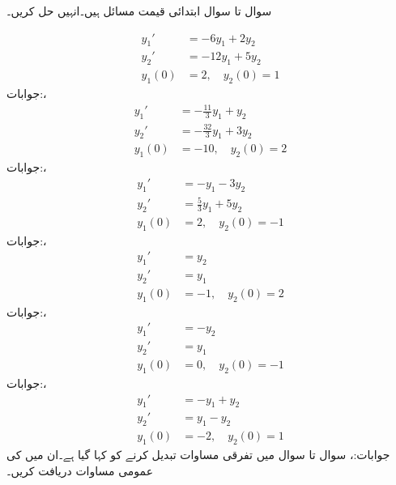 سوال  تا سوال  ابتدائی قیمت مسائل ہیں۔انہیں حل کریں۔

\begin{align*}
y_1'&=-6y_1+2y_2\\
y_2'&=-12y_1+5y_2\\
y_1(0)&=2,\quad y_2(0)=1
\end{align*}
جوابات:، 
\begin{align*}
y_1'&=-\frac{11}{3}y_1+y_2\\
y_2'&=-\frac{32}{3}y_1+3y_2\\
y_1(0)&=-10,\quad y_2(0)=2
\end{align*}
جوابات:، 
\begin{align*}
y_1'&=-y_1-3y_2\\
y_2'&=\frac{5}{3}y_1+5y_2\\
y_1(0)&=2,\quad y_2(0)=-1
\end{align*}
جوابات:، 
\begin{align*}
y_1'&=y_2\\
y_2'&=y_1\\
y_1(0)&=-1,\quad y_2(0)=2
\end{align*}
جوابات:، 
\begin{align*}
y_1'&=-y_2\\
y_2'&=y_1\\
y_1(0)&=0,\quad y_2(0)=-1
\end{align*}
جوابات:، 
\begin{align*}
y_1'&=-y_1+y_2\\
y_2'&=y_1-y_2\\
y_1(0)&=-2,\quad y_2(0)=1
\end{align*}
جوابات:، 
سوال  تا سوال  میں تفرقی مساوات تبدیل کرنے کو کہا گیا ہے۔ان میں  کی عمومی مساوات دریافت کریں۔

